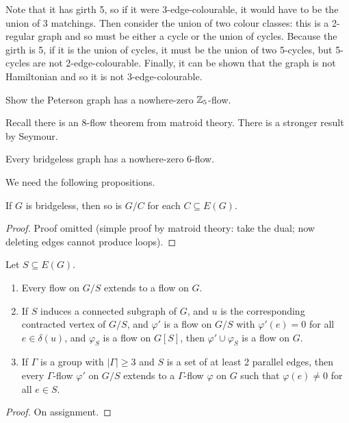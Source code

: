 \documentclass[main.tex]{subfiles}
\begin{document}
Note that it has girth 5, so if it were 3-edge-colourable, it would have to be
the union of 3 matchings.
Then consider the union of two colour classes: this is a 2-regular graph and so
must be either a cycle or the union of cycles.
Because the girth is 5, if it is the union of cycles, it must be the union of
two 5-cycles, but 5-cycles are not 2-edge-colourable.
Finally, it can be shown that the graph is not Hamiltonian and so it is not
3-edge-colourable.
\begin{exercise*}
  Show the Peterson graph has a nowhere-zero $\mathbb Z_5$-flow.
\end{exercise*}
Recall there is an 8-flow theorem from matroid theory.
There is a stronger result by Seymour.
\begin{theorem}[Seymour '81]
  Every bridgeless graph has a nowhere-zero 6-flow.
\end{theorem}
We need the following propositions.
\begin{proposition}
  If $G$ is bridgeless, then so is $G/C$ for each $C\subseteq E(G)$.
\end{proposition}
\begin{proof}
  Proof omitted (simple proof by matroid theory: take the dual; now deleting
  edges cannot produce loops).
\end{proof}\begin{proposition}
  Let $S\subseteq E(G)$.
  \begin{enumerate}[label=(\arabic*)]
    \item Every flow on $G/S$ extends to a flow on $G$.

    \item If $S$ induces a connected subgraph of $G$, and $u$ is the
      corresponding contracted vertex of $G/S$, and $\varphi'$ is a flow on
      $G/S$ with $\varphi'(e) = 0$ for all $e\in\delta(u)$, and $\varphi_S$ is a
      flow on $G[S]$, then $\varphi'\cup\varphi_S$ is a flow on $G$.

    \item If $\Gamma$ is a group with $|\Gamma|\geq 3$ and $S$ is a set of
      at least 2 parallel edges, then every $\Gamma$-flow $\varphi'$ on $G/S$
      extends to a $\Gamma$-flow $\varphi$ on $G$ such that $\varphi(e)\neq 0$
      for all $e\in S$.
  \end{enumerate}
\end{proposition}
\begin{proof}
  On assignment.
\end{proof}
\end{document}
